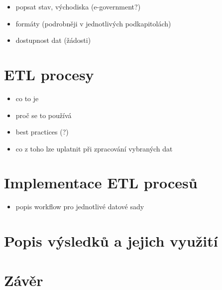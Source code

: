 \begin{itemize}

\item
  popsat stav, východiska (e-government?)
\item
  formáty (podrobněji v jednotlivých podkapitolách)
\item
  dostupnost dat (žádosti)
\end{itemize}
\chapter{ETL procesy}

\begin{itemize}

\item
  co to je
\item
  proč se to používá
\item
  best practices (?)
\item
  co z toho lze uplatnit při zpracování vybraných dat
\end{itemize}
\chapter{Implementace ETL procesů}

\begin{itemize}

\item
  popis workflow pro jednotlivé datové sady
\end{itemize}
\chapter{Popis výsledků a jejich využití}
\chapter*{Závěr}
